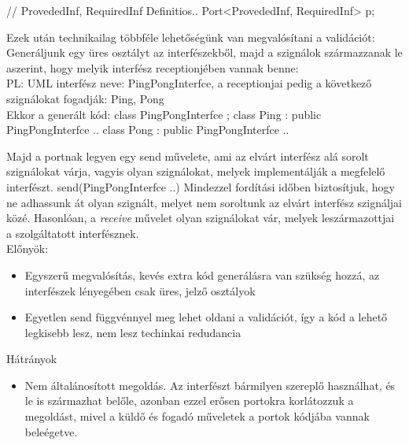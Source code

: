 \documentclass[a4paper,12pt]{report}
\begin{document}
// ProvededInf, RequiredInf Definitios..
Port<ProvededInf, RequiredInf> p;

Ezek után technikailag többféle lehetőségünk van megvalósítani a validációt: \\
Generáljunk egy üres osztályt az interfészekből, majd a szignálok származzanak le aszerint, hogy melyik interfész receptionjében vannak benne: \\
PL: UML interfész neve: PingPongInterfce, a receptionjai pedig a következő szignálokat fogadják: Ping, Pong \\
Ekkor a generált kód:
class PingPongInterfce {};
class Ping  : public PingPongInterfce ..
class Pong  : public PingPongInterfce ..

Majd a portnak legyen egy send művelete, ami az elvárt interfész alá sorolt szignálokat várja, vagyis olyan szignálokat, melyek implementálják a megfelelő interfészt.
send(PingPongInterfce ..)
Mindezzel fordítási időben biztosítjuk, hogy ne adhassunk át olyan szignált, melyet nem soroltunk az elvárt interfész szignáljai közé. Hasonlóan, a \textit{receive} művelet olyan szignálokat vár, melyek leszármazottjai a szolgáltatott interfésznek. \\

Előnyök:
\begin{itemize}
\item Egyszerű megvalósítás, kevés extra kód generálásra van szükség hozzá, az interfészek lényegében csak üres, jelző osztályok
\item Egyetlen send függvénnyel meg lehet oldani a validációt, így a kód a lehető legkisebb lesz, nem lesz techinkai redudancia
\end{itemize}
Hátrányok
\begin{itemize}
\item Nem általánosított megoldás. Az interfészt bármilyen szereplő használhat, és le is származhat belőle, azonban ezzel erősen portokra korlátozzuk a megoldást, mivel a küldő és fogadó műveletek a portok kódjába vannak beleégetve.
\end{itemize}
\end{document}
